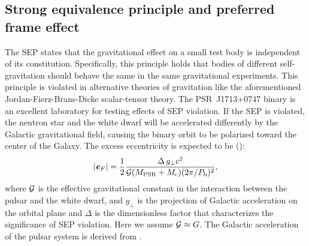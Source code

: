 \subsection{Strong equivalence principle and preferred frame effect}
\label{sec:sep}
The SEP states that the gravitational
effect on a small test body is independent of its constitution. Specifically,
this principle holds that bodies of different self-gravitation should behave the same in
the same gravitational experiments. This principle is violated in alternative
theories of gravitation like the aforementioned Jordan-Fierz-Brans-Dicke
scalar-tensor theory. The PSR~J1713+0747 binary is an excellent laboratory for testing 
effects of SEP violation. If the SEP is violated, the neutron star and the white
dwarf will be accelerated differently by the Galactic gravitational field, causing
the binary orbit to be polarized toward the center of the Galaxy. The excess 
eccentricity is expected to be (\citealt{ds91}):
\begin{equation}
|\textbf{\textit{e}}_F| = \frac{1}{2}\frac{\Delta\, g_{\bot}
  c^2}{\msG(M_{\rm PSR}+M_{\rm
c})(2\pi/P_{\rm b})^2},
\end{equation}
where $\mathcal{G}$ is the effective gravitational constant in the interaction
between the pulsar and the white dwarf, and $g_{\bot}$ is the projection of Galactic acceleration on the orbital plane 
and $\Delta$ is the dimensionless factor that characterizes the significance 
of SEP violation. Here we assume $\mathcal{G}\approx G$.
The Galactic acceleration of the pulsar system is derived from \citet{hf04a, rmb+14}.

